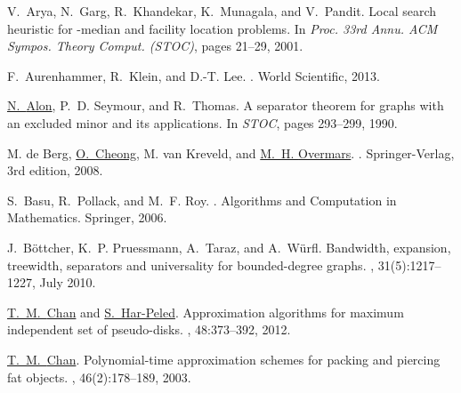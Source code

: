 \InSubmitVer{\documentclass[11pt]{article}}
\numberwithin{figure}{section}
\numberwithin{table}{section}
\numberwithin{equation}{section}
\begin{document}
  \providecommand{\urlSarielPaper}[1]{ \href{\SarielWWWPapersAddr/#1}
  {\SarielWWWPapers{}/#1}}  \providecommand{\CNFX}[1]{ {\em{\textrm{(#1)}}}}\providecommand{\CNFSTOC}{\CNFX{STOC}}\providecommand{\CNFFOCS}{\CNFX{FOCS}}\begin{thebibliography}{{Har}11b}

V.~Arya, N.~Garg, R.~Khandekar, K.~Munagala, and V.~Pandit.
\newblock Local search heuristic for -median and facility location problems.
\newblock In {\em Proc. 33rd Annu. ACM Sympos. Theory Comput.\CNFSTOC}, pages
  21--29, 2001.

F.~Aurenhammer, R.~Klein, and D.-T. Lee.
.
\newblock World Scientific, 2013.

\href{http://www.math.tau.ac.il/~nogaa/}{N.~{Alon}}, P.~D. Seymour, and R.~Thomas.
\newblock A separator theorem for graphs with an excluded minor and its
  applications.
\newblock In {\em STOC}, pages 293--299, 1990.

{M. de} Berg, \href{http://www.win.tue.nl/~ocheong}{O.~{Cheong}}, {M. van} Kreveld, and \href{http://www.cs.uu.nl/people/markov/}{M.~H. {Overmars}}.
.
\newblock Springer-Verlag, 3rd edition, 2008.

S.~Basu, R.~Pollack, and M.~F. Roy.
.
\newblock Algorithms and Computation in Mathematics. Springer, 2006.

J.~{B{\"o}ttcher}, K.~P. {Pruessmann}, A.~{Taraz}, and A.~{W{\"u}rfl}.
\newblock Bandwidth, expansion, treewidth, separators and universality for
  bounded-degree graphs.
, 31(5):1217--1227, July 2010.

\href{http://www.math.uwaterloo.ca/~tmchan/}{T.~M.~{Chan}} and \href{http://www.uiuc.edu/~sariel}{S.~{{Har-Peled}}}.
\newblock Approximation algorithms for maximum independent set of pseudo-disks.
, 48:373--392, 2012.

\href{http://www.math.uwaterloo.ca/~tmchan/}{T.~M.~{Chan}}.
\newblock Polynomial-time approximation schemes for packing and piercing fat
  objects.
, 46(2):178--189, 2003.


\end{thebibliography}
\end{document}
